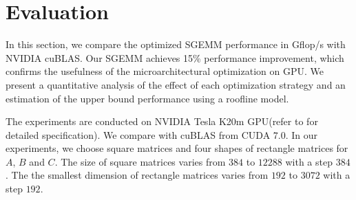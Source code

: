 \section{Evaluation}
\label{sec:experiment}

In this section, we compare the optimized SGEMM performance in Gflop/s with NVIDIA cuBLAS. 
Our SGEMM achieves 15\% %
performance
improvement, which confirms the usefulness of the microarchitectural optimization on GPU. 
We present 
a quantitative analysis of the effect of each optimization strategy and an estimation of the upper bound performance using a roofline model.

The experiments are conducted on NVIDIA Tesla K20m GPU(refer to \cite{gk110} for detailed specification). 
We compare with cuBLAS from CUDA $7.0$. In our experiments, we choose square matrices and four shapes of rectangle matrices for $A$, $B$
and $C$. The size of square matrices varies from $384$ to $12288$ with a step $384$. The the smallest dimension of rectangle matrices varies from $192$ to $3072$ with a step $192$.

